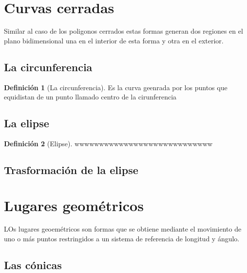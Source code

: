 \documentclass[
  16pt,
]{krantz}
\theoremstyle{definition}
\newtheorem{definition}{Definición}[chapter]
\theoremstyle{definition}
\theoremstyle{definition}
\theoremstyle{definition}
\theoremstyle{remark}
\begin{document}
\hypertarget{curvas-cerradas}{%
\section{Curvas cerradas}\label{curvas-cerradas}}

Similar al caso de los poligonos cerrados estas formas generan dos regiones en el plano bidimensional una en el interior de esta forma y otra en el exterior.

\hypertarget{la-circunferencia}{%
\subsection{La circunferencia}\label{la-circunferencia}}

\begin{definition}[La circunferencia]
\protect\hypertarget{def:circulo}{}{\label{def:circulo} {} }Es la curva geenrada por los puntos que equidistan de un punto llamado centro de la cirunferencia
\end{definition}

\hypertarget{la-elipse}{%
\subsection{La elipse}\label{la-elipse}}

\begin{definition}[Elipse]
\protect\hypertarget{def:elipse}{}{\label{def:elipse} {} }wwwwwwwwwwwwwwwwwwwwwwwwwwww
\end{definition}

\hypertarget{trasformaciuxf3n-de-la-elipse}{%
\subsection{Trasformación de la elipse}\label{trasformaciuxf3n-de-la-elipse}}

\hypertarget{lugares-geomuxe9tricos}{%
\section{Lugares geométricos}\label{lugares-geomuxe9tricos}}

LOs lugares geoemétricos son formas que se obtiene mediante el movimiento de uno o más puntos restringidos a un sistema de referencia de longitud y ángulo.

\hypertarget{las-cuxf3nicas}{%
\subsection{Las cónicas}\label{las-cuxf3nicas}}
\end{document}
